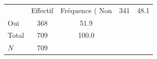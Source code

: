 {
\def\sym#1{\ifmmode^{#1}\else\(^{#1}\)\fi}
\begin{tabular}{l*{1}{cc}}
\toprule
            &    Effectif&Fréquence (%
\midrule
Non         &         341&        48.1\\
Oui         &         368&        51.9\\
Total       &         709&       100.0\\
\midrule
\(N\)       &         709&            \\
\bottomrule
\end{tabular}
}
